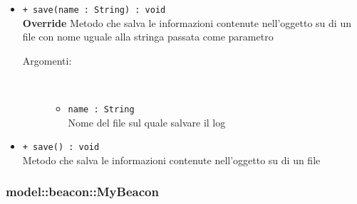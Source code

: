 \documentclass[../DefinizioneDiProdotto.tex]{subfiles}
\begin{document}
\begin{description}
\begin{itemize}
\begin{description}
\end{description}
\item \texttt{+ save(name : String) : void}\\
\textbf{Override} Metodo che salva le informazioni contenute nell'oggetto su di un file con nome uguale alla stringa passata come parametro
 \begin{description}
\item[Argomenti:] \
\begin{itemize}
\item \texttt{name : String}\\
Nome del file sul quale salvare il log\end{itemize}
\end{description}
\item \texttt{+ save() : void}\\
Metodo che salva le informazioni contenute nell'oggetto su di un file
 \end{itemize}
\end{description}

\subsubsection{model::beacon::MyBeacon}
\end{document}
